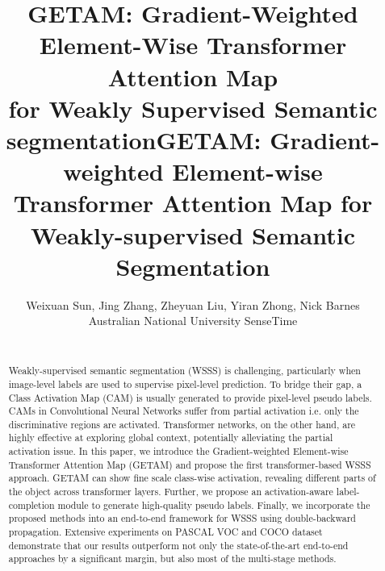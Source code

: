 \documentclass[10pt,twocolumn,letterpaper]{article}
\begin{document}
\title{GETAM: Gradient-Weighted Element-Wise Transformer Attention Map \\for Weakly Supervised Semantic segmentation}

\title{GETAM: Gradient-weighted Element-wise Transformer Attention Map for Weakly-supervised Semantic Segmentation}

\author{Weixuan Sun, Jing Zhang, Zheyuan Liu, Yiran Zhong, Nick Barnes\\
Australian National University    SenseTime  \\
\\
}
\maketitle

\begin{abstract}
Weakly-supervised semantic segmentation (WSSS) is
challenging, particularly when 
image-level labels are used to supervise pixel-level prediction. To bridge their gap, a Class Activation Map (CAM) is usually generated to provide pixel-level pseudo labels. 
CAMs in Convolutional Neural Networks suffer from partial activation i.e. only the discriminative regions are activated.
Transformer networks, on the other hand, are highly effective at exploring global context,
potentially alleviating the partial activation issue. 
In this paper, we introduce the Gradient-weighted Element-wise Transformer Attention Map (GETAM) and propose the first transformer-based WSSS approach.
GETAM can
show fine scale class-wise activation, revealing different parts of the object across transformer layers. 
Further, we propose an activation-aware label-completion module to generate high-quality pseudo labels. 
Finally, we incorporate the proposed methods into an end-to-end framework for WSSS using double-backward propagation. 
Extensive experiments on PASCAL VOC and COCO dataset demonstrate that our results outperform
not only the state-of-the-art end-to-end approaches by a significant margin, but also most of
the multi-stage methods.
\end{abstract}









\maketitle
\end{document}
